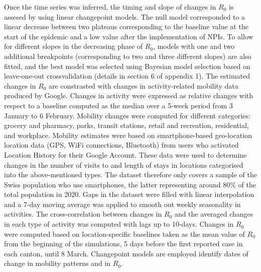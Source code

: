 Once the time series was inferred, the timing and slope of changes in $R_0$ is assesed by using linear changepoint models\cite{Lindelov:McpPackageRegression:2020}. The null model corresponded to a linear decrease between two plateaus corresponding to the baseline value at the start of the epidemic and a low value after the implementation of NPIs. To allow for different slopes in the decreasing phase of $R_0$, models with one and two additional breakpoints (corresponding to two and three different slopes) are also fitted, and the best model was selected using Bayesian model selection based on leave-one-out crossvalidation (details in section 6 of appendix 1). The estimated changes in $R_0$  are constrasted with changes in activity-related mobility data produced by Google\cite{GoogleLLC:GoogleCOVID19Community:2020}. Changes in activity were expressed as relative changes with respect to a baseline computed as the median over a 5-week period from 3 January to 6 February. Mobility changes were computed for different categories: grocery and pharmacy, parks, transit stations, retail and recreation, residential, and workplace. Mobility estimates were based on smartphone-based geo-location location data (GPS, WiFi connections, Bluetooth) from users who activated Location History for their Google Account. These data were used to determine changes in the number of visits to and length of stays in locations categorised into the above-mentioned types. The dataset therefore only covers a sample of the Swiss population who use smartphones, the latter representing around 80\% of the total population in 2020\cite{ODea:SmartphoneUsersSwitzerland:2020}. Gaps in the dataset were filled with linear interpolation and a 7-day moving average was applied to smooth out weekly seasonality in activities. The cross-correlation between changes in $R_0$ and the averaged changes in each type of activity was computed with lags up to 10-days. Changes in $R_0$ were computed based on location-specific baselines taken as the mean value of $R_0$ from the beginning of the simulations, 5 days before the first reported case in each canton, until 8 March. Changepoint models are employed identify dates of change in mobility patterns and in $R_0$. 


